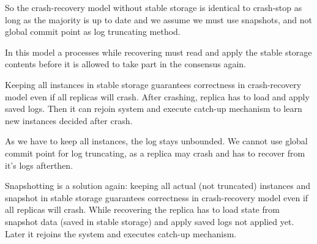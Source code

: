 %  
%  
%  

So the crash-recovery model without stable storage is identical to crash-stop as long as the majority is up to date and we assume we must use snapshots, and not global commit point as log truncating method.


In this model a processes while recovering must read and apply the stable storage contents before it is allowed to take part in the consensus again.

Keeping all instances in stable storage guarantees correctness in crash-recovery model even if all replicas will crash. After crashing, replica has to load and apply saved logs. Then it can rejoin system and execute catch-up mechanism to learn new instances decided after crash.

As we have to keep all instances, the log stays unbounded. We cannot use global commit point for log truncating, as a replica may crash and has to recover from it's logs afterthen.

Snapshotting is a solution again: keeping all actual (not truncated) instances and snapshot in stable storage guarantees correctness in crash-recovery model even if all replicas will crash. While recovering the replica has to load state from snapshot data (saved in stable storage) and apply saved logs not applied yet. Later it rejoins the system and executes catch-up mechanism.

